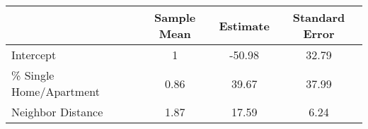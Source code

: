 \begin{tabular}{lccc}
 & Sample Mean & Estimate & Standard Error \\
\hline
Intercept & 1 &-50.98 &32.79\\
\% Single Home/Apartment  &0.86&39.67&37.99\\
Neighbor Distance &1.87&17.59&6.24\\
\hline
\end{tabular} 
